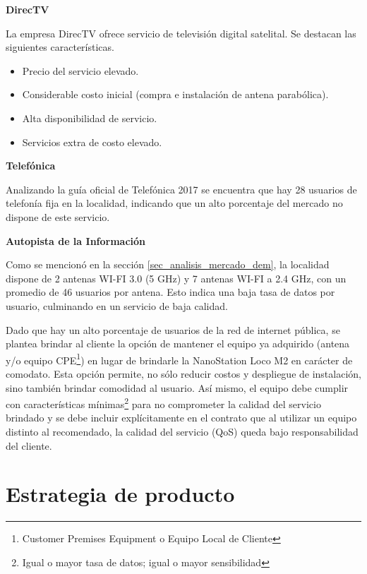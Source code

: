 \documentclass[12pt,a4paper]{book}
\begin{document}
\noindent \textbf{DirecTV}

\medskip 

La empresa DirecTV ofrece servicio de televisión digital satelital. Se destacan las siguientes características.

\begin{itemize}
\item Precio del servicio elevado.
\item Considerable costo inicial (compra e instalación de antena parabólica).
\item Alta disponibilidad de servicio.
\item Servicios extra de costo elevado.
\end{itemize}

\medskip 

\noindent \textbf{Telefónica}

\medskip 

Analizando la guía oficial de Telefónica 2017 se encuentra que hay 28 usuarios de telefonía fija en la localidad, indicando que un alto porcentaje del mercado no dispone de este servicio.    

\medskip 

\noindent\textbf{Autopista de la Información}

Como se mencionó en la sección \ref{sec_analisis_mercado_dem}, la localidad dispone de 2 antenas WI-FI 3.0 (5 GHz) y 7 antenas WI-FI a 2.4 GHz, con un promedio de 46 usuarios por antena. Esto indica una baja tasa de datos por usuario, culminando en un servicio de baja calidad.

\medskip 

Dado que hay un alto porcentaje de usuarios de la red de internet pública, se plantea brindar al cliente la opción de mantener el equipo ya adquirido (antena y/o equipo CPE\footnote{Customer Premises Equipment o Equipo Local de Cliente}) en lugar de brindarle la NanoStation Loco M2 en carácter de comodato. Esta opción permite, no sólo reducir costos y despliegue de instalación, sino también brindar comodidad al usuario. Así mismo, el equipo debe cumplir con características mínimas\footnote{Igual o mayor tasa de datos; igual o mayor sensibilidad} para no comprometer la calidad del servicio brindado y se debe incluir explícitamente en el contrato que al utilizar un equipo distinto al recomendado, la calidad del servicio (QoS) queda bajo responsabilidad del cliente.  

\medskip 

\section{Estrategia de producto}
\end{document}
